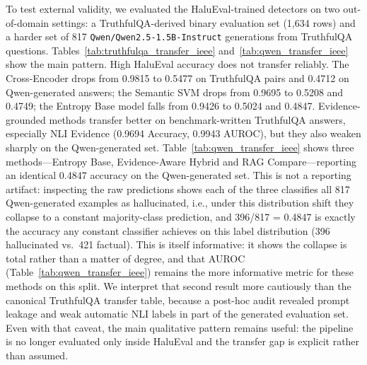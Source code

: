 \documentclass[conference]{IEEEtran}
\begin{document}
To test external validity, we evaluated the HaluEval-trained detectors on two
out-of-domain settings: a TruthfulQA-derived binary evaluation set (1,634 rows)
and a harder set of 817 \texttt{Qwen/Qwen2.5-1.5B-Instruct} generations from
TruthfulQA questions. Tables~\ref{tab:truthfulqa_transfer_ieee}
and~\ref{tab:qwen_transfer_ieee} show the main pattern.
High HaluEval accuracy does not transfer reliably. The Cross-Encoder drops from
0.9815 to 0.5477 on TruthfulQA pairs and 0.4712 on Qwen-generated answers; the
Semantic SVM drops from 0.9695 to 0.5208 and 0.4749; the Entropy Base model
falls from 0.9426 to 0.5024 and 0.4847. Evidence-grounded methods transfer
better on benchmark-written TruthfulQA answers, especially NLI Evidence
(0.9694 Accuracy, 0.9943 AUROC), but they also weaken sharply on the
Qwen-generated set. Table~\ref{tab:qwen_transfer_ieee} shows three
methods---Entropy Base, Evidence-Aware Hybrid and RAG Compare---reporting an
identical 0.4847 accuracy on the Qwen-generated set. This is not a reporting
artifact: inspecting the raw predictions shows each of the three classifies
all 817 Qwen-generated examples as hallucinated, i.e., under this
distribution shift they collapse to a constant majority-class prediction, and
396/817 = 0.4847 is exactly the accuracy any constant classifier achieves on
this label distribution (396 hallucinated vs.\ 421 factual). This is itself
informative: it shows the collapse is total rather than a matter of degree,
and that AUROC (Table~\ref{tab:qwen_transfer_ieee}) remains the more
informative metric for these methods on this split. We interpret that second result more cautiously than the
canonical TruthfulQA transfer table, because a post-hoc audit revealed prompt
leakage and weak automatic NLI labels in part of the generated evaluation set.
Even with that caveat, the main qualitative pattern remains useful: the
pipeline is no longer evaluated only inside HaluEval and the transfer gap is
explicit rather than assumed.

\begin{table}[t]
  \centering
  \caption{Transfer to canonical TruthfulQA evaluation.}
  \label{tab:truthfulqa_transfer_ieee}
  \renewcommand{\arraystretch}{1.08}
  \footnotesize
\end{table}
\end{document}
